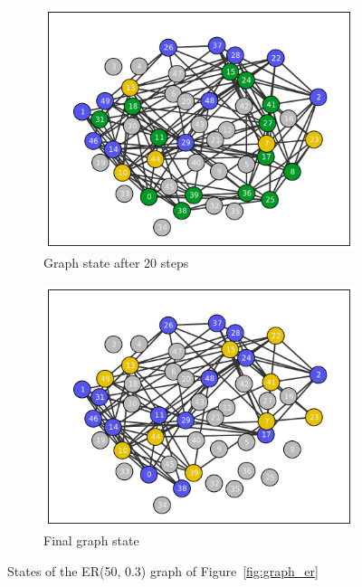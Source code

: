 \documentclass[11pt]{article} %
\begin{document}
\begin{figure}[t]
\begin{subfigure}[b]{0.5\textwidth}
    \includegraphics[width=\textwidth]{figures/ER_evo_50_03_20}
    \caption{Graph state after 20 steps}
  \end{subfigure}
  \begin{subfigure}[b]{0.5\textwidth}
    \centering
    \includegraphics[width=\textwidth]{figures/ER_evo_50_03_final}
    \caption{Final graph state}
  \end{subfigure}

  \caption{States of the ER(50, 0.3) graph of Figure~\ref{fig:graph_er}}
    \label{fig:graph_evo_er}
\end{figure}
\end{document}

